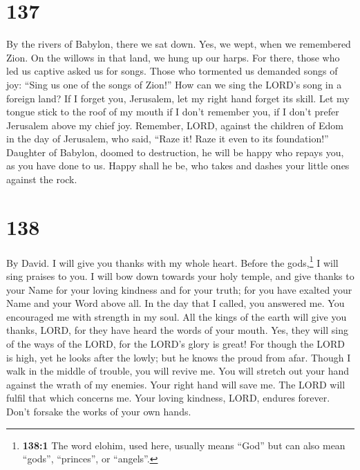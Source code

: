 \hypertarget{section-129}{%
\section{137}\label{section-129}}

 By the rivers of Babylon, there we sat down. Yes, we
wept, when we remembered Zion.  On the willows in that
land, we hung up our harps.  For there, those who led us
captive asked us for songs. Those who tormented us demanded songs of
joy: ``Sing us one of the songs of Zion!''  How can we
sing the LORD's song in a foreign land?  If I forget you,
Jerusalem, let my right hand forget its skill.  Let my
tongue stick to the roof of my mouth if I don't remember you, if I don't
prefer Jerusalem above my chief joy.  Remember, LORD,
against the children of Edom in the day of Jerusalem, who said, ``Raze
it! Raze it even to its foundation!''  Daughter of
Babylon, doomed to destruction, he will be happy who repays you, as you
have done to us.  Happy shall he be, who takes and dashes
your little ones against the rock.

\hypertarget{section-130}{%
\section{138}\label{section-130}}

By David.  I will give you thanks with my whole heart.
Before the gods,\footnote{\textbf{138:1} The word elohim, used here,
  usually means ``God'' but can also mean ``gods'', ``princes'', or
  ``angels''.} I will sing praises to you.  I will bow
down towards your holy temple, and give thanks to your Name for your
loving kindness and for your truth; for you have exalted your Name and
your Word above all.  In the day that I called, you
answered me. You encouraged me with strength in my soul. 
All the kings of the earth will give you thanks, LORD, for they have
heard the words of your mouth.  Yes, they will sing of the
ways of the LORD, for the LORD's glory is great!  For
though the LORD is high, yet he looks after the lowly; but he knows the
proud from afar.  Though I walk in the middle of trouble,
you will revive me. You will stretch out your hand against the wrath of
my enemies. Your right hand will save me.  The LORD will
fulfil that which concerns me. Your loving kindness, LORD, endures
forever. Don't forsake the works of your own hands.

